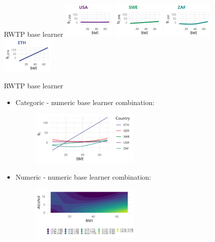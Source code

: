 \documentclass[t,10pt]{beamer}
\begin{document}
\begin{frame}{RWTP base learner}
  {\includegraphics[width=0.19\textwidth]{figures/bs-tensor/fig-tensor-USA.png}}
  \includegraphics[width=0.19\textwidth]{figures/bs-tensor/fig-tensor-SWE.png}
  {\includegraphics[width=0.19\textwidth]{figures/bs-tensor/fig-tensor-ZAF.png}}
  {\includegraphics[width=0.19\textwidth]{figures/bs-tensor/fig-tensor-ETH.png}}
  \addtocounter{framenumber}{-1}
\end{frame}

\begin{frame}{RWTP base learner}
  \begin{itemize}
    \item Categoric - numeric base learner combination:
      \begin{figure}
        \centering
        \includegraphics[width=0.5\textwidth]{figures/bs-tensor/fig-cat-num.png}
      \end{figure}
    \item Numeric - numeric base learner combination:
      \begin{figure}
        \centering
        \includegraphics[width=0.5\textwidth]{figures/bs-tensor/fig-num-num.png}
      \end{figure}
  \end{itemize}
\end{frame}
\end{document}
